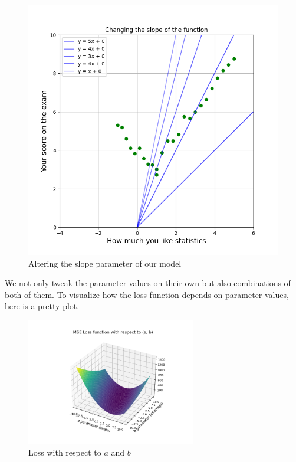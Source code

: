 \documentclass{article}
\begin{document}
\begin{figure}[h]
\begin{minipage}{0.4\textwidth}
            \includegraphics[width=\linewidth]{../images/myplot4.png}
            \caption{Altering the slope parameter of our model}
        \end{minipage}
    \end{figure}

    We not only tweak the parameter values on their own but also combinations of both of them.
    To visualize how the loss function depends on parameter values, here is a pretty plot.

    \begin{figure}[h]
        \centering
        \includegraphics[width=0.66\textwidth]{../images/myplot5.png}
        \caption{Loss with respect to $a$ and $b$}
        \label{fig:loss_3d}
    \end{figure}
\end{document}
